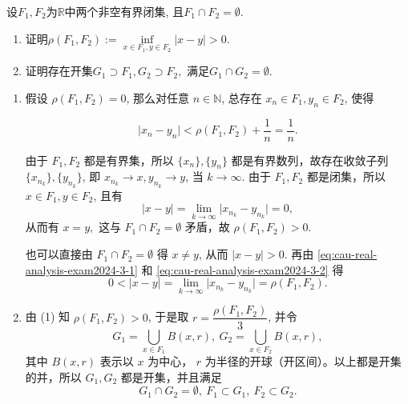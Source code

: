 
\begin{question}[points = 10]
  设$F_1, F_2$为$\mathbb{R}$中两个非空有界闭集, 且$F_1 \cap F_2 = \emptyset.$
  \begin{enumerate}
    \item 证明$\rho(F_1, F_2) := \inf\limits_{x\in F_1, y\in F_2} \lvert x - y \rvert > 0.$
    \item 证明存在开集$G_1 \supset F_1, G_2 \supset F_2,$ 满足$G_1 \cap G_2 = \emptyset.$
  \end{enumerate}

\end{question}

\begin{solution}
  \begin{enumerate}
    \item 假设 \(\rho(F_1, F_2) = 0\), 那么对任意 \(n \in \mathbb{N}\), 总存在 \(x_n \in F_1, y_n \in F_2\), 使得

    \begin{equation}
    \label{eq:cau-real-analysis-exam2024-3-1}
    \lvert x_n - y_n \rvert < \rho(F_1, F_2) + \dfrac{1}{n} = \dfrac{1}{n}.
    \end{equation}

    由于 \(F_1, F_2\) 都是有界集，所以 \(\{x_n\}, \{y_n\}\) 都是有界数列，故存在收敛子列 \(\{x_{n_k}\}, \{y_{n_k}\}\), 即 \(x_{n_k} \to x, y_{n_k} \to y\), 当 \(k \to \infty\). 由于 \(F_1, F_2\) 都是闭集，所以 \(x \in F_1, y \in F_2\), 且有
    \begin{equation}
    \label{eq:cau-real-analysis-exam2024-3-2}
    \lvert x - y \rvert = \lim\limits_{k\to\infty} \lvert x_{n_k} - y_{n_k} \rvert = 0,
    \end{equation}
    从而有 \(x = y,\) 这与 \(F_1 \cap F_2 = \emptyset\) 矛盾，故 \(\rho(F_1, F_2) > 0\).

    也可以直接由 \(F_1 \cap F_2 = \emptyset\) 得 \(x \neq y\), 从而    \(\lvert x - y \rvert > 0\). 再由 \eqref{eq:cau-real-analysis-exam2024-3-1} 和 \eqref{eq:cau-real-analysis-exam2024-3-2} 得
    \[0 < \lvert x - y \rvert = \lim\limits_{k\to\infty} \lvert x_{n_k} - y_{n_k} \rvert = \rho(F_1, F_2).\]
    \item 由 (1) 知 \(\rho(F_1, F_2) > 0\), 于是取 \(r = \dfrac{\rho(F_1, F_2)}{3}\), 并令
    \[
    G_1 = \bigcup\limits_{x\in F_1} B(x, r), ~ G_2 = \bigcup\limits_{x\in F_2} B(x, r),
    \]
    其中 \(B(x, r)\) 表示以 \(x\) 为中心， \(r\) 为半径的开球（开区间）。以上都是开集的并，所以 \(G_1, G_2\) 都是开集，并且满足
    \[G_1 \cap G_2 = \emptyset, ~ F_1 \subset G_1, ~ F_2 \subset G_2.\]
  \end{enumerate}
\end{solution}

